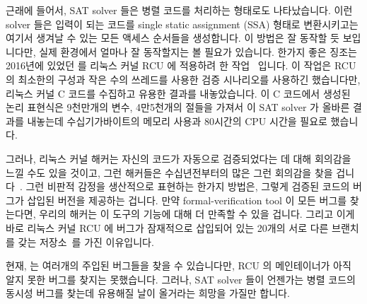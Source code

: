 근래에 들어서, SAT solver 들은 병렬 코드를 처리하는 형태로도 나타났습니다.
이런 solver 들은 입력이 되는 코드를 single static assignment (SSA) 형태로
변환시키고는 여기서 생겨날 수 있는 모든 액세스 순서들을 생성합니다.
이 방법은 잘 동작할 듯 보입니다만, 실제 환경에서 얼마나 잘 동작할지는 볼 필요가
있습니다.
한가지 좋은 징조는 2016년에 있었던  를 리눅스 커널 RCU 에 적용하려 한
작업~\cite{LihaoLiang2016VerifyTreeRCU,LanceRoy2017CBMC-SRCU} 입니다.
이 작업은 RCU 의 최소한의 구성과 작은 수의 쓰레드를 사용한 검증 시나리오를
사용하긴 했습니다만, 리눅스 커널 C 코드를 수집하고 유용한 결과를 내놓았습니다.
이 C 코드에서 생성된 논리 표현식은 9천만개의 변수, 4만5천개의 절들을 가져서 이
SAT solver 가 올바른 결과를 내놓는데 수십기가바이트의 메모리 사용과 80시간의
CPU 시간을 필요로 했습니다.

그러나, 리눅스 커널 해커는 자신의 코드가 자동으로 검증되었다는 데 대해 회의감을
느낄 수도 있을 것이고, 그런 해커들은 수십년전부터의 많은 그런 회의감을 찾을
겁니다~\cite{DeMillo:1979:SPP:359104.359106}.
그런 비판적 감정을 생산적으로 표현하는 한가지 방법은, 그렇게 검증된 코드의
버그가 삽입된 버전을 제공하는 겁니다.
만약 formal-verification tool 이 모든 버그를 찾는다면, 우리의 해커는 이 도구의
기능에 대해 더 만족할 수 있을 겁니다.
그리고 이게 바로 리눅스 커널 RCU 에 버그가 잠재적으로 삽입되어 있는 20개의 서로
다른 브랜치를 갖는 
저장소~\cite{PaulEMcKenney2017VerificationChallenge6}를 가진 이유입니다.

현재,  는 여러개의 주입된 버그들을 찾을 수 있습니다만, RCU 의
메인테이너가 아직 알지 못한 버그를 찾지는 못했습니다.
그러나, SAT solver 들이 언젠가는 병렬 코드의 동시성 버그를 찾는데 유용해질 날이
올거라는 희망을 가질만 합니다.
\iffalse

